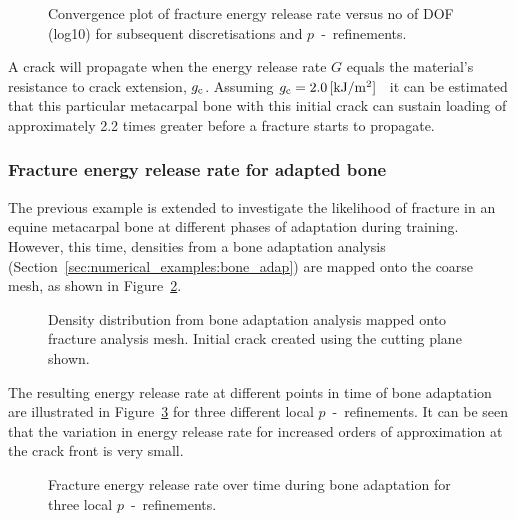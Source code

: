 \documentclass[twocolumn]{svjour3}
\begin{document}
\begin{figure}[h!]
	\centering
	
	\caption{Convergence plot of fracture energy release rate versus no of DOF (log10) for subsequent discretisations and $p$~-~refinements.}
	\label{fig:max_g1_convergece}
\end{figure}
A crack will propagate when the energy release rate $G$ equals the material's resistance to crack extension, $g_{\rm c}$. Assuming $g_{\rm c} = 2.0\,[\mathrm{ kJ/m^2}]$~\cite{gasser2007numerical} it can be estimated that this particular metacarpal bone with this initial crack can sustain loading of approximately 2.2 times greater before a fracture starts to propagate. 

\subsubsection{Fracture energy release rate for adapted bone}
The previous example is extended to investigate the likelihood of fracture in an equine metacarpal bone at different phases of adaptation during training.
However, this time, densities from a bone adaptation analysis (Section~\ref{sec:numerical_examples:bone_adap}) are mapped onto the coarse mesh, as shown in Figure~\ref{fig:frackmeshcutting}. 
\begin{figure}[h]
	\centering
			\def\svgwidth{7cm}
		
	\caption{Density distribution from bone adaptation analysis mapped onto fracture analysis mesh. Initial crack created using the cutting plane shown.}
	\label{fig:frackmeshcutting}
\end{figure}
The resulting energy release rate at different points in time of bone adaptation are illustrated in Figure~\ref{fig:crackmc3release} for three different local $p$~-~refinements. It can be seen that the variation in energy release rate for increased orders of approximation at the crack front is very small. 
\begin{figure}[h!]
	\centering
	\caption{Fracture energy release rate over time during bone adaptation for three local $p$~-~refinements.}
	\label{fig:crackmc3release}
\end{figure}
\end{document}
